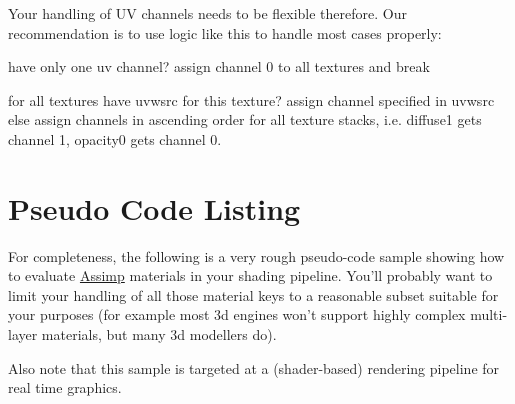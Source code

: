 Your handling of U\+V channels needs to be flexible therefore. Our recommendation is to use logic like this to handle most cases properly\+:

\begin{DoxyVerb}have only one uv channel?
   assign channel 0 to all textures and break

for all textures
   have uvwsrc for this texture?
      assign channel specified in uvwsrc
   else
      assign channels in ascending order for all texture stacks, 
        i.e. diffuse1 gets channel 1, opacity0 gets channel 0.\end{DoxyVerb}
\hypertarget{materials_pseudo}{}\section{Pseudo Code Listing}\label{materials_pseudo}
For completeness, the following is a very rough pseudo-\/code sample showing how to evaluate \hyperlink{class_assimp}{Assimp} materials in your shading pipeline. You'll probably want to limit your handling of all those material keys to a reasonable subset suitable for your purposes (for example most 3d engines won't support highly complex multi-\/layer materials, but many 3d modellers do).

Also note that this sample is targeted at a (shader-\/based) rendering pipeline for real time graphics.


